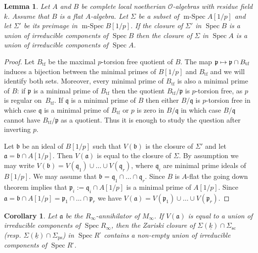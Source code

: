 \documentclass[JEP,XML,SOM,Unicode,NoEqCountersInSection]{cedram}
\let\mathcal\mathscr
\newcommand\mto{\mathchoice{\longmapsto}{\mapsto}{\mapsto}{\mapsto}}
\newcommand{\ssquare}{{\scriptscriptstyle\square}}
\newcommand{\rps}{\mathrm{ps}}
\newcommand{\rsc}{\mathrm{sc}}
\newtheorem{lem}[prop]{Lemma}
\newtheorem{cor}[prop]{Corollary}
\theoremstyle{definition}
\DeclareMathOperator{\Spec}{Spec}
\DeclareMathOperator{\mSpec}{m-Spec}
\newcommand{\cO}{\mathcal{O}}
\newcommand{\pp}{\mathfrak p}
\newcommand{\qq}{\mathfrak{q}}
\begin{document}
\begin{lem}\label{going_down} Let $A$ and $B$ be complete local noetherian $\cO$-algebras with residue field $k$. Assume that
$B$ is a flat $A$-algebra. Let $\Sigma$ be a subset of $\mSpec A[1/p]$ and let $\Sigma'$ be its preimage in
$\mSpec B[1/p]$. If the closure of $\Sigma'$ in $\Spec B$ is a union of irreducible components of $\Spec B$ then
the closure of $\Sigma$ in $\Spec A$ is a union of irreducible components of $\Spec A$.
\end{lem}

\begin{proof} Let $B_{\mathrm{tf}}$ be the maximal $p$-torsion free quotient of $B$. The map $\pp\mto \pp \cap B_{\mathrm{tf}}$ induces a bijection between the minimal primes of $B[1/p]$ and
$B_{\mathrm{tf}}$ and we will identify both sets. Moreover, every minimal prime of $B_{\mathrm{tf}}$
is also a minimal prime of $B$: if $\pp$ is a minimal prime of $B_{\mathrm{tf}}$ then the
quotient $B_{\mathrm{tf}}/\pp$ is $p$-torsion free, as $p$ is regular on~$B_{\mathrm{tf}}$. If $\qq$ is a minimal prime of $B$ then either $B/\qq$ is $p$-torsion free
in which case $\qq$ is a minimal prime of $B_{\mathrm{tf}}$ or $p$ is zero in $B/\qq$ in which case
$B/\qq$ cannot have $B_{\mathrm{tf}}/\pp$ as a quotient. Thus it is enough to study the question after inverting $p$.

Let $\mathfrak b$ be an ideal of $B[1/p]$ such that $V(\mathfrak b)$ is the closure of $\Sigma'$ and
let \hbox{$\mathfrak a= \mathfrak b \cap A[1/p]$}. Then $V(\mathfrak a)$ is equal to the closure of $\Sigma$. By assumption we may write
\hbox{$V(\mathfrak b)= V(\qq_1)\cup\ldots \cup V(\qq_r)$}, where $\qq_i$ are minimal prime ideals of $B[1/p]$. We may assume that
$\mathfrak b = \qq_1\cap \ldots \cap \qq_r$. Since $B$ is $A$-flat the going down theorem implies that $\pp_i:=\qq_i \cap A[1/p]$ is a minimal prime
of $A[1/p]$. Since $\mathfrak a= \mathfrak b \cap A[1/p]= \pp_1\cap \ldots \cap \pp_r$ we have $V(\mathfrak a)= V(\pp_1)\cup \ldots \cup V(\pp_r)$.
\end{proof}

\begin{cor}\label{local} Let $\mathfrak a$ be the $R_{\infty}$-annihilator of $M_{\infty}$. If $V(\mathfrak a)$ is equal to a union of irreducible components of $\Spec R_{\infty}$,
then the Zariski closure of $\Sigma(\underline{k}) \cap \Sigma_{\rsc}$ (resp. $\Sigma(\underline{k}) \cap \Sigma_{\rps}$) in $\Spec R^\ssquare$
contains a non-empty
union of irreducible components of $\Spec R^\ssquare$.
\end{cor}
\end{document}
